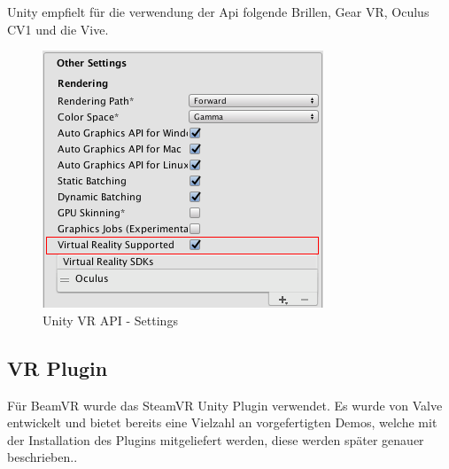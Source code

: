 \begin{itemize}
Unity empfielt für die verwendung der Api folgende Brillen, Gear VR, Oculus CV1 und die Vive.
~\cite{Unity_VR_Overview_2022}

\begin {figure}
    \centering
    \includegraphics[scale=0.8]{pics/unity_basis_vr_api_settings}
    \caption{Unity VR API - Settings}
    \label{fig:unity_vr_api_settings}
\end {figure}

\subsection{VR Plugin}
Für BeamVR wurde das SteamVR Unity Plugin verwendet.
Es wurde von Valve entwickelt und bietet bereits eine Vielzahl an vorgefertigten Demos, welche mit der Installation des Plugins mitgeliefert werden, diese werden später genauer beschrieben..
~\cite{SteamVR_Overview_2022}


\end{itemize}
